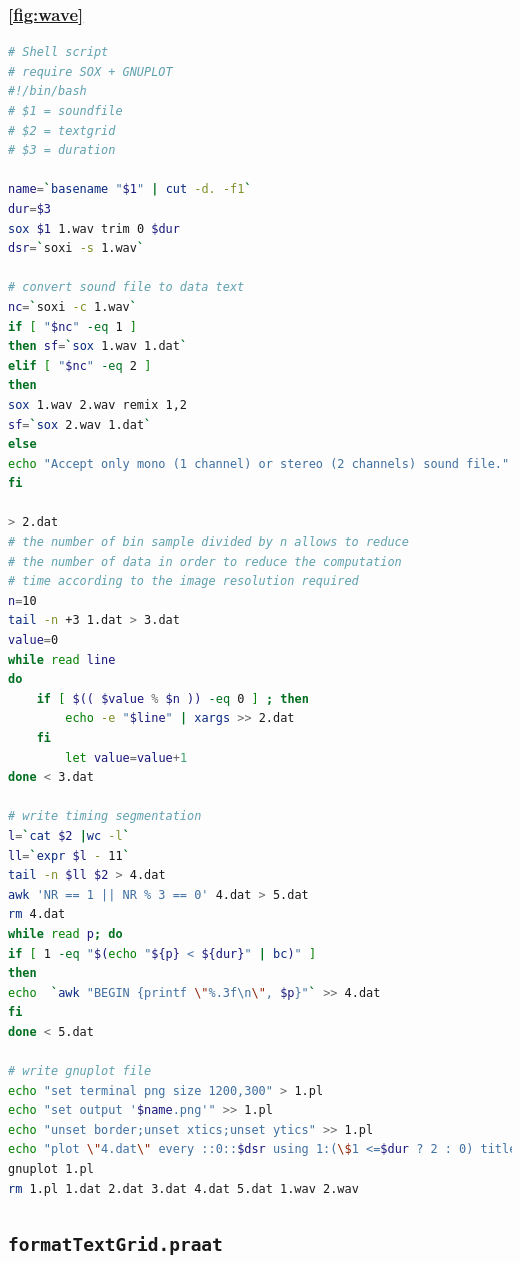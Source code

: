 \documentclass{book}
\begin{document}
\subsubsection{\ref{fig:wave}}
\label{an:wav}
\begin{lstlisting}[language=bash]
# Shell script
# require SOX + GNUPLOT
#!/bin/bash
# $1 = soundfile
# $2 = textgrid
# $3 = duration

name=`basename "$1" | cut -d. -f1`
dur=$3
sox $1 1.wav trim 0 $dur
dsr=`soxi -s 1.wav`

# convert sound file to data text
nc=`soxi -c 1.wav`
if [ "$nc" -eq 1 ]
then sf=`sox 1.wav 1.dat`
elif [ "$nc" -eq 2 ]
then 
sox 1.wav 2.wav remix 1,2
sf=`sox 2.wav 1.dat`
else
echo "Accept only mono (1 channel) or stereo (2 channels) sound file."
fi

> 2.dat
# the number of bin sample divided by n allows to reduce 
# the number of data in order to reduce the computation 
# time according to the image resolution required
n=10 
tail -n +3 1.dat > 3.dat
value=0
while read line
do
    if [ $(( $value % $n )) -eq 0 ] ; then
        echo -e "$line" | xargs >> 2.dat
    fi
        let value=value+1 
done < 3.dat

# write timing segmentation 
l=`cat $2 |wc -l`
ll=`expr $l - 11`
tail -n $ll $2 > 4.dat
awk 'NR == 1 || NR % 3 == 0' 4.dat > 5.dat
rm 4.dat
while read p; do
if [ 1 -eq "$(echo "${p} < ${dur}" | bc)" ]
then
echo  `awk "BEGIN {printf \"%.3f\n\", $p}"` >> 4.dat
fi
done < 5.dat	

# write gnuplot file
echo "set terminal png size 1200,300" > 1.pl
echo "set output '$name.png'" >> 1.pl
echo "unset border;unset xtics;unset ytics" >> 1.pl
echo "plot \"4.dat\" every ::0::$dsr using 1:(\$1 <=$dur ? 2 : 0) title '' with impulses lc rgb '#A9A9A9', \"2.dat\" every ::0::$dsr using 1:(\$2+1) with lines lc rgb '#696969' title \"\"" >> 1.pl
gnuplot 1.pl
rm 1.pl 1.dat 2.dat 3.dat 4.dat 5.dat 1.wav 2.wav	
\end{lstlisting}


\subsection{\texttt{formatTextGrid.praat}}
\label{ftg}
\end{document}
